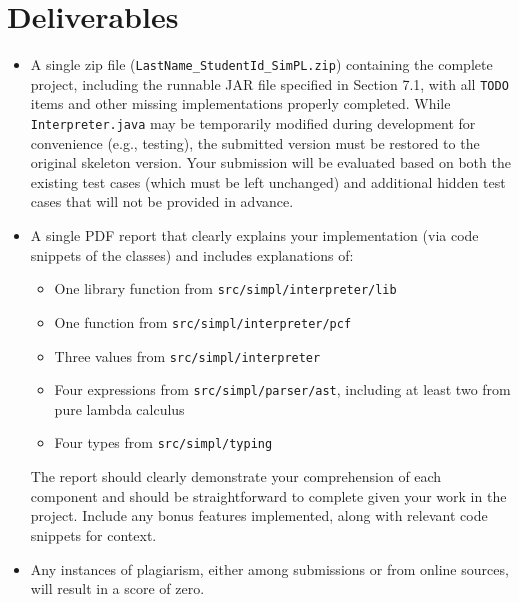 \documentclass{article}
\begin{document}
\section{Deliverables}
\begin{itemize}
  \item A single zip file (\texttt{LastName\_StudentId\_SimPL.zip}) containing the complete project, including the runnable JAR file specified in Section 7.1, with all \texttt{TODO} items and other missing implementations properly completed. While \texttt{Interpreter.java} may be temporarily modified during development for convenience (e.g., testing), the submitted version must be restored to the original skeleton version. Your submission will be evaluated based on both the existing test cases (which must be left unchanged) and additional hidden test cases that will not be provided in advance.
  \item A single PDF report that clearly explains your implementation (via code snippets of the classes) and includes explanations of:
    \begin{itemize}
      \item One library function from \texttt{src/simpl/interpreter/lib}
      \item One function from \texttt{src/simpl/interpreter/pcf}
      \item Three values from \texttt{src/simpl/interpreter}
      \item Four expressions from \texttt{src/simpl/parser/ast}, including at least two from pure lambda calculus
      \item Four types from \texttt{src/simpl/typing}
    \end{itemize}
The report should clearly demonstrate your comprehension of each component and should be straightforward to complete given your work in the project. Include any bonus features implemented, along with relevant code snippets for context.

  \item Any instances of plagiarism, either among submissions or from online sources, will result in a score of zero.

\end{itemize}
\end{document}
